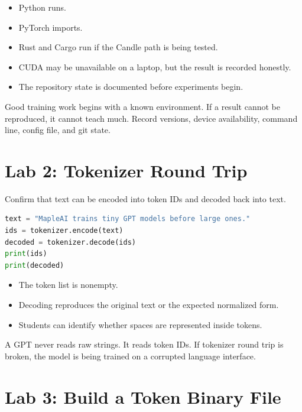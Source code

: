 
\begin{itemize}
  \item Python runs.
  \item PyTorch imports.
  \item Rust and Cargo run if the Candle path is being tested.
  \item CUDA may be unavailable on a laptop, but the result is recorded honestly.
  \item The repository state is documented before experiments begin.
\end{itemize}

 Good training work begins with a known environment. If a result cannot be reproduced, it cannot teach much. Record versions, device availability, command line, config file, and git state.

\section{Lab 2: Tokenizer Round Trip}

 Confirm that text can be encoded into token IDs and decoded back into text.


\begin{lstlisting}[language=Python]
text = "MapleAI trains tiny GPT models before large ones."
ids = tokenizer.encode(text)
decoded = tokenizer.decode(ids)
print(ids)
print(decoded)
\end{lstlisting}


\begin{itemize}
  \item The token list is nonempty.
  \item Decoding reproduces the original text or the expected normalized form.
  \item Students can identify whether spaces are represented inside tokens.
\end{itemize}

 A GPT never reads raw strings. It reads token IDs. If tokenizer round trip is broken, the model is being trained on a corrupted language interface.

\section{Lab 3: Build a Token Binary File}

